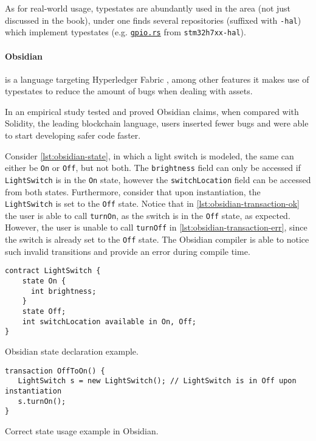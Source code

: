 As for real-world usage, typestates are abundantly used in the area (not just discussed in the book),
under \autocite{Stm32} one finds several repositories (suffixed with \texttt{-hal})
which implement typestates
(e.g. \href{https://github.com/stm32-rs/stm32h7xx-hal/blob/master/src/gpio.rs#L51-L128}{\texttt{gpio.rs}}
from \texttt{stm32h7xx-hal}).

\paragraph{Obsidian} is a language targeting Hyperledger Fabric \autocite{Fabric2021},
among other features it makes use of typestates to reduce the amount of bugs when dealing with assets.

In \autocite{Coblenz2020} an empirical study tested and proved Obsidian claims,
when compared with Solidity, the leading blockchain language,
users inserted fewer bugs and were able to start developing safer code faster.

Consider \autoref{lst:obsidian-state}, in which a light switch is modeled,
the same can either be \texttt{On} or \texttt{Off}, but not both.
The \texttt{brightness} field can only be accessed if \texttt{LightSwitch} is in the \texttt{On} state,
however the \texttt{switchLocation} field can be accessed from both states.
Furthermore, consider that upon instantiation, the \texttt{LightSwitch} is set to the \texttt{Off} state.
Notice that in \autoref{lst:obsidian-transaction-ok} the user is able to call \texttt{turnOn},
as the switch is in the \texttt{Off} state, as expected.
However, the user is unable to call \texttt{turnOff} in \autoref{lst:obsidian-transaction-err},
since the switch is already set to the \texttt{Off} state.
The Obsidian compiler is able to notice such invalid transitions and provide an error during compile time.

\begin{listing}
    \centering
    \begin{verbatim}
contract LightSwitch {
    state On {
      int brightness;
    }
    state Off;
    int switchLocation available in On, Off;
}
    \end{verbatim}
    \caption{Obsidian state declaration example.}
    \label{lst:obsidian-state}
\end{listing}

\begin{listing}
    \centering
    \begin{verbatim}
transaction OffToOn() {
   LightSwitch s = new LightSwitch(); // LightSwitch is in Off upon instantiation
   s.turnOn();
}
    \end{verbatim}
    \caption{Correct state usage example in Obsidian.}
    \label{lst:obsidian-transaction-ok}
\end{listing}

